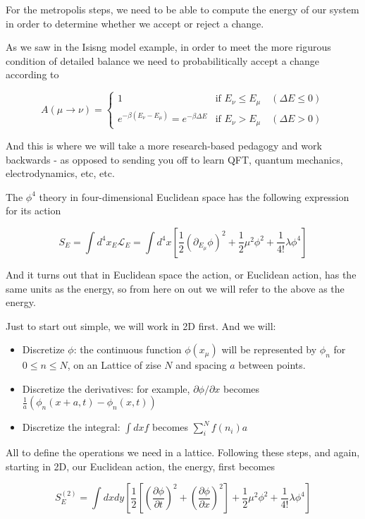 For the metropolis steps, we need to be able to compute the energy of our system in order to determine whether we
accept or reject a change.

As we saw in the Isisng model example, in order to meet the more rigurous condition of detailed balance we need to
probabilitically accept a change according to

$$
A(\mu \rightarrow \nu)
=
\begin{cases}
1           & \text{if } E_\nu \leq E_\mu \quad(\Delta E \leq 0) \\
e^{-\beta (E_\nu - E_\mu)} = e^{-\beta \Delta E}   & \text{if } E_\nu > E_\mu \quad(\Delta E > 0)
\end{cases}
$$

And this is where we will take a more research-based pedagogy and work backwards - as opposed to sending you off
to learn QFT, quantum mechanics, electrodynamics, etc, etc.

The $\phi^4$ theory in four-dimensional Euclidean space has the following expression for its action

$$
S_{E} = 
\int d^4 x_E \mathcal{L}_{E} =
\int d^4 x \left[ 
    \frac{1}{2} \left( \partial_{E_\mu} \phi \right)^2 + \frac{1}{2} \mu^{2} \phi^2 + \frac{1}{4!} \lambda \phi^4
\right]
$$

And it turns out that in Euclidean space the action, or Euclidean action, has the same units as the energy,
so from here on out we will refer to the above as the energy.

Just to start out simple, we will work in 2D first.
And we will:

\begin{itemize}
\item Discretize $\phi$: the continuous function $\phi(x_\mu)$ will be represented by $\phi_n$ for $0 \leq n \leq N$,
    on an Lattice of zise $N$ and spacing $a$ between points.
\item Discretize the derivatives: for example, $\partial \phi / \partial x$ becomes
    $\frac{1}{a} \left( \phi_n(x+a,t) - \phi_n(x,t) \right)$
\item Discretize the integral: $\int dx f$ becomes $\sum^{N}_{i} f(n_i) a$
\end{itemize}

All to define the operations we need in a lattice.
Following these steps, and again, starting in 2D, our Euclidean action, the energy, first becomes

$$
S_{E}^{(2)} = 
\int dx dy
\left[ 
    \frac{1}{2} \left[ \left( \frac{\partial \phi}{\partial t} \right)^2 +  \left( \frac{\partial \phi}{\partial x} \right)^2 \right] 
    + \frac{1}{2} \mu^{2} \phi^2 + \frac{1}{4!} \lambda \phi^4
\right]
$$

